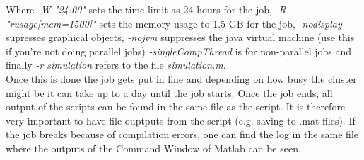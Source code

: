 Where \textit{-W "24:00"} sets the time limit as 24 hours for the job, \textit{-R "rusage[mem=1500]"} sets the memory usage to 1.5 GB for the job, \textit{-nodisplay} supresses graphical objects, \textit{-nojvm} suppresses the java virtual machine (use this if you're not doing parallel jobs) \textit{-singleCompThread} is for non-parallel jobs and finally \textit{-r simulation} refers to the file \textit{simulation.m}.\\

Once this is done the job gets put in line and depending on how busy the cluster might be it can take up to a day until the job starts. Once the job ends, all output of the scripts can be found in the same file as the script. It is therefore very important to have file ouptputs from the script (e.g. saving to .mat files). If the job breaks because of compilation errors, one can find the log in the same file where the outputs of the Command Window of Matlab can be seen.



